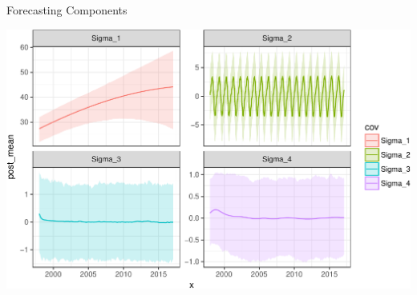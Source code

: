 \documentclass[11pt,ignorenonframetext,]{beamer}
\begin{document}
\begin{frame}{%
\protect\hypertarget{forecasting-components}{%
Forecasting Components}}

\begin{center}\includegraphics[width=\textwidth]{Lec14_files/figure-beamer/unnamed-chunk-27-1} \end{center}

\end{frame}
\end{document}
